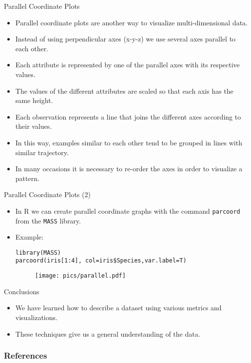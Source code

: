 \documentclass[handout]{beamer}
\begin{document}
\begin{frame}[fragile]{Parallel Coordinate Plots}
\scriptsize{
 \begin{itemize}
  \item Parallel coordinate plots are another way to visualize multi-dimensional data.
  \item Instead of using perpendicular axes (x-y-z) we use several axes parallel to each other.
  \item Each attribute is represented by one of the parallel axes with its respective values.
  \item The values of the different attributes are scaled so that each axis has the same height.
  \item  Each observation represents a line that joins the different axes according to their values.
  \item In this way, examples similar to each other tend to be grouped in lines with similar trajectory.
  \item In many occasions it is necessary to re-order the axes in order to visualize a pattern.
 \end{itemize} 
 
 }  
\end{frame}


\begin{frame}[fragile]{Parallel Coordinate Plots (2)}
\scriptsize{
 \begin{itemize}
  \item  In R we can create parallel coordinate graphs with the command \verb+parcoord+ from the \verb+MASS+ library.
  \item Example:
  \begin{verbatim}
library(MASS)
parcoord(iris[1:4], col=iris$Species,var.label=T)   
  \end{verbatim}
  
  \begin{figure}[h!]
	\centering
	\texttt{[image: pics/parallel.pdf]}		
\end{figure}   

 \end{itemize} 
 
 }  
\end{frame}

\begin{frame}[fragile]{Conclusions}
\scriptsize{
 \begin{itemize}
  \item We have learned how to describe a dataset using various metrics and visualizations.
  \item These techniques give us a general understanding of the data.  
 \end{itemize} 
 
 }  
\end{frame}




\begin{frame}[allowframebreaks]\scriptsize
\frametitle{References}


%
\end{frame}  












\end{document}
